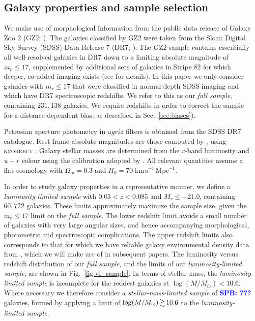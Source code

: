 \documentclass[useAMS,usenatbib]{mn2e}
\newcommand{\spb}[1]{{\bf \textcolor{blue}{SPB: #1}}}
\begin{document}
\subsection{Galaxy properties and sample selection}

We make use of morphological information from the public data release of Galaxy Zoo 2 (GZ2; \citealt{Willett_13}). The galaxies classified by GZ2 were taken from the Sloan Digital Sky Survey (SDSS) Data Release 7 (DR7; \citealt{Abazijian_09}). The GZ2 sample contains essentially all well-resolved galaxies in DR7 down to a limiting absolute magnitude of $m_r \leq 17$, supplemented by additional sets of galaxies in Stripe 82 for which deeper, co-added imaging exists (see \citealt{Willett_13} for details).  In this paper we only consider galaxies with $m_r \leq 17$ that were classified in normal-depth SDSS imaging and which have DR7 spectroscopic redshifts. We refer to this as our \textit{full sample}, containing $231,138$ galaxies.  We require redshifts in order to correct the sample for a distance-dependent bias, as described in Sec.~\ref{sec:biases}).

Petrosian aperture photometry in $ugriz$ filters is obtained from the SDSS DR7 catalogue. Rest-frame absolute magnitudes are those computed by \citet{Bamford_09}, using \textsc{kcorrect} \citep{Blanton_07}. Galaxy stellar masses are determined from the $r$-band luminosity and $u-r$ colour using the calibration adopted by \citet{Baldry_06}.
All relevant quantities assume a flat cosmology with $\Omega_\mathrm{m} = 0.3$ and $H_0 = 70\;\mathrm{km\,s^{-1}\,Mpc^{-1}}$.

In order to study galaxy properties in a representative manner, we define a \textit{luminosity-limited sample} with $0.03<z<0.085$ and $M_r \le -21.0$, containing $60,722$ galaxies.  These limits approximately maximize the sample size, given the $m_r \le 17$ limit on the \textit{full sample}. The lower redshift limit avoids a small number of galaxies with very large angular sizes, and hence accompanying morphological, photometric and spectroscopic complications. The upper redshift limits also corresponds to that for which we have reliable galaxy environmental density data from \cite{Baldry_06}, which we will make use of in subsequent papers.  The luminosity versus redshift distribution of our \textit{full sample}, and the limits of our \textit{luminosity-limited sample}, are shown in Fig.~\ref{fig:vl_sample}.
In terms of stellar mass, the \textit{luminosity limited sample} is incomplete for the reddest galaxies at $\log (M/M_{\odot}) < 10.6$. Where necessary we therefore consider a \textit{stellar-mass-limited sample} of \spb{???} galaxies, formed by applying a limit of $\log (M/M_{\odot}) \ga 10.6$ to the \textit{luminosity-limited sample}.
\end{document}
